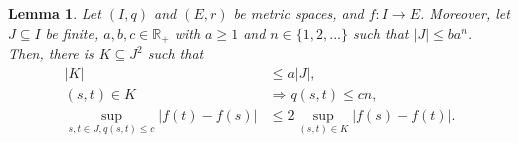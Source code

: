 \documentclass{article}
\newtheorem{lemma}[proposition]{Lemma}
\theoremstyle{definition}
\theoremstyle{step} \newtheorem{step}{Step}
\begin{document}
\begin{lemma}\label{l:chain}
  Let $(I,q)$ and $(E,r)$ be metric spaces, and $f: I\to E$. Moreover, let $J \subseteq I$ be finite, $a,b,c\in\mathbb R_+$ with $a\geq 1$ and $n \in \{1,2,...\}$ such that $|J| \leq b a^n$. Then, there is $K \subseteq J^2$ such that
  \begin{align}
    |K|                                          & \leq a |J|, \label{eq:chain1}                 \\
    (s,t) \in K                                  & \Rightarrow q(s,t) \leq cn, \label{eq:chain2} \\
    \sup_{s,t\in J, q(s,t) \leq c} |f(t) - f(s)| & \leq 2 \sup_{(s,t) \in K} |f(s) - f(t)|.
    \label{eq:chain3}
  \end{align}
\end{lemma}
\end{document}
